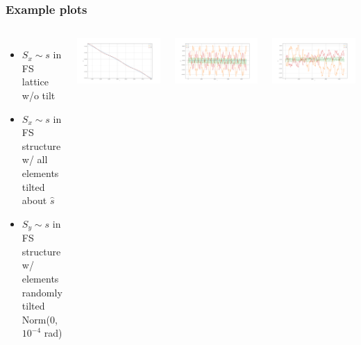 \documentclass[pdf]{beamer}
\begin{document}
	\begin{frame}
		\frametitle{Example plots}
		\begin{columns}
			\begin{itemize}
				\item $S_x \sim s$ in FS lattice w/o tilt
				\item $S_x \sim s$ in FS structure w/ all elements tilted about $\hat s$
				\item $S_y \sim s$ in FS structure w/ elements randomly tilted Norm(0, $10^{-4}$ rad)
			\end{itemize}
			\begin{minipage}{.3\textheight}
				\includegraphics[scale=.15]{Sy_300_sigma_tilts_0057_deg_piece}
			\end{minipage}
			\begin{minipage}{.3\textheight}
				\includegraphics[scale=.15]{Sx_300_no_tilt}
			\end{minipage}
			\begin{minipage}{.3\textheight}
				\includegraphics[scale=.15]{Sx_300_all_tilts_3_6}

\end{minipage}
\end{columns}
\end{frame}
\end{document}
